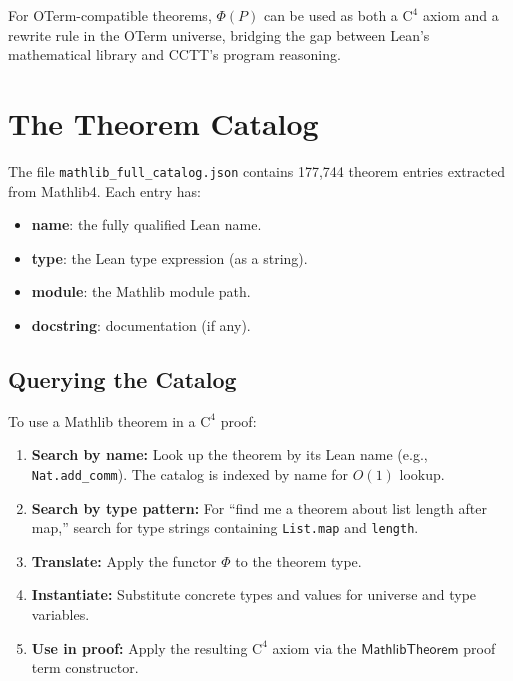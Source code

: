 For OTerm-compatible theorems, $\Phi(P)$ can be used as both a
$\mathrm{C}^4$ axiom and a rewrite rule in the OTerm universe, bridging
the gap between Lean's mathematical library and CCTT's program reasoning.


\section{The Theorem Catalog}
\label{sec:catalog}

The file \texttt{mathlib\_full\_catalog.json} contains 177,744 theorem
entries extracted from Mathlib4.  Each entry has:

\begin{itemize}
\item \textbf{name}: the fully qualified Lean name.
\item \textbf{type}: the Lean type expression (as a string).
\item \textbf{module}: the Mathlib module path.
\item \textbf{docstring}: documentation (if any).
\end{itemize}

\subsection{Querying the Catalog}

To use a Mathlib theorem in a $\mathrm{C}^4$ proof:

\begin{enumerate}
\item \textbf{Search by name:} Look up the theorem by its Lean name
  (e.g., \texttt{Nat.add\_comm}).  The catalog is indexed by name for
  $O(1)$ lookup.

\item \textbf{Search by type pattern:} For ``find me a theorem about
  list length after map,'' search for type strings containing
  \texttt{List.map} and \texttt{length}.

\item \textbf{Translate:} Apply the functor $\Phi$ to the theorem type.

\item \textbf{Instantiate:} Substitute concrete types and values for
  universe and type variables.

\item \textbf{Use in proof:} Apply the resulting $\mathrm{C}^4$ axiom
  via the $\mathsf{MathlibTheorem}$ proof term constructor.
\end{enumerate}

